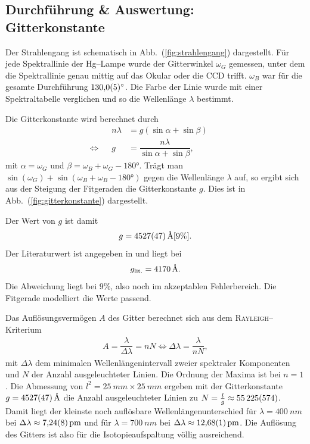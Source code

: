 \documentclass[sn-mathphys-num,iicol]{sn-jnl}
\theoremstyle{thmstyleone}
\theoremstyle{thmstyletwo}
\theoremstyle{thmstylethree}
\begin{document}
\subsection{Durchführung \& Auswertung:\\Gitterkonstante} \label{sec:d&a:gitterkonstante}
Der Strahlengang ist schematisch in Abb.\ (\ref{fig:strahlengang}) dargestellt.
Für jede Spektrallinie der Hg--Lampe wurde der Gitterwinkel $\omega _G$ gemessen, unter dem die Spektrallinie genau mittig auf das Okular oder die CCD trifft.
$\omega _B$ war für die gesamte Durchführung $\ang{130+-.5}$.
Die Farbe der Linie wurde mit einer Spektraltabelle \cite{Anleitung402} verglichen und so die Wellenlänge $\lambda $ bestimmt.

Die Gitterkonstante wird berechnet durch
\begin{align} 
        &&n\lambda &=g\left(\sin \alpha +\sin \beta \right)&&\\
        \Leftrightarrow &&g&=\dfrac{n\lambda }{\sin \alpha +\sin \beta },&&
\end{align} 
mit $\alpha =\omega _G$ und $\beta =\omega _B+\omega _G-\ang{180}$.
Trägt man $\sin \left(\omega _G\right)+\sin \left(\omega _B+\omega _B-\ang{180}\right)$ gegen die Wellenlänge $\lambda $ auf, so ergibt sich aus der Steigung der Fitgeraden die Gitterkonstante $g$.
Dies ist in Abb.\ (\ref{fig:gitterkonstante}) dargestellt.

Der Wert von $g$ ist damit
\begin{align} 
        g=\SI{4527+-47}{\text{\r{A}}}[9\%]
.\end{align} 
Der Literaturwert ist angegeben in \cite{LeyboldBalmerserieBeobachtung} und liegt bei
\begin{align} 
        g_\text{lit.}=\SI{4170}{\text{\r{A}}}
.\end{align} 
Die Abweichung liegt bei $9\%$, also noch im akzeptablen Fehlerbereich.
Die Fitgerade modelliert die Werte passend.

Das Auflösungsvermögen $A$ des Gitter berechnet sich aus dem \textsc{Rayleigh}--Kriterium
\begin{align} 
        A=\dfrac{\lambda }{\Delta \lambda }=nN \Leftrightarrow \Delta \lambda = \dfrac{\lambda }{nN}
,\end{align} 
mit $\Delta \lambda $ dem minimalen Wellenlängenintervall zweier spektraler Komponenten und $N$ der Anzahl ausgeleuchteter Linien.
Die Ordnung der Maxima ist bei $n=1$.
Die Abmessung von $l^2=\SI{25}{mm}\times \SI{25}{mm}$ ergeben mit der Gitterkonstante $g=\SI{4527+-47}{\text{\r{A}}}$ die Anzahl ausgeleuchteter Linien zu $N=\tfrac{l}{g} \approx \SI{55225+-574}{}$.
Damit liegt der kleinste noch auflösbare Wellenlängenunterschied für $\lambda =\SI{400}{nm}$ bei $\Delta \lambda \approx \SI{7.24+-0.08}{pm}$ und für $\lambda =\SI{700}{nm}$ bei $\Delta \lambda \approx \SI{12.68+-0.01}{pm}$.
Die Auflösung des Gitters ist also für die Isotopieaufspaltung völlig ausreichend.
\end{document}
